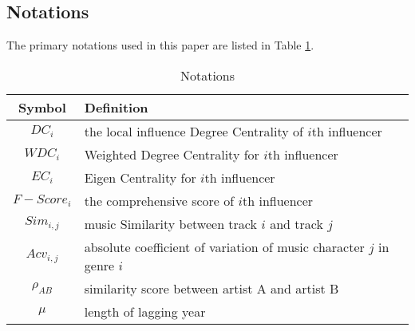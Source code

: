 \documentclass[12pt]{article}  %
\begin{document}
	
	\subsection{Notations}
	The primary notations used in this paper are listed in Table \ref{tb:notation}.
	\begin{table}[!htbp]
		\begin{center}
			\caption{Notations}
			\begin{tabular}{c|l}
				\toprule
				\multicolumn{1}{m{3cm}}{\centering Symbol}
				&\multicolumn{1}{m{8cm}}{ Definition}\\
				\midrule
				$DC_{i}$& the local influence Degree Centrality of $i$th influencer \\
				$WDC_{i}$& Weighted Degree Centrality for $i$th influencer \\
				$EC_{i}$& Eigen Centrality for $i$th influencer\\
				$F-Score_{i}$& the comprehensive score of $i$th influencer \\
				$Sim_{i,j}$ & music Similarity between track $i$ and track $j$ \\
				$Acv_{i,j}$& absolute coefficient of variation of music character $j$ in genre $i$\\
				$\rho_{AB}$ & similarity score between artist A and artist B\\
				$\mu$ & length of lagging year\\
				\bottomrule
			\end{tabular}\label{tb:notation}
		\end{center}
	\end{table}
	
	
		
\end{document}
